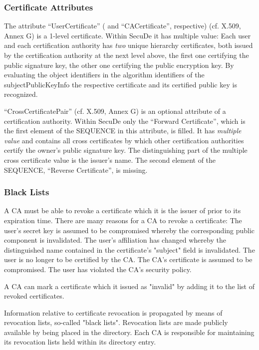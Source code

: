 \subsubsection{Certificate Attributes}
\label{ds-ca}

The attribute ``UserCertificate'' ( and ``CACertificate'', respective)
(cf. X.509, Annex G)
is a 1-level certificate. Within SecuDe
it has multiple value:
Each user and each certification authority has {\em two}
unique hierarchy certificates, both issued by the certification
authority at the next level above,
the first one certifying
the public signature key, the other one certifying
the public encryption key.
By evaluating the object identifiers in the algorithm identifiers
of the subjectPublicKeyInfo the respective certificate and its
certified public key is recognized.

``CrossCertificatePair'' (cf. X.509, Annex G)
is an optional attribute of a certification authority.
Within SecuDe
only the ``Forward Certificate'',
which is the first element of the SEQUENCE in this attribute,
is filled.
It has {\em multiple value}
and contains all cross certificates by which other
certification authorities certify the owner's
public signature key.
The distinguishing part of the multiple cross certificate value
is the issuer's name.
The second element of the SEQUENCE,
``Reverse Certificate'', is missing.

\subsubsection{Black Lists}
\label{ds-bl}

A CA must be able to revoke a certificate which it is the issuer
of prior to its expiration time. There are many reasons for a CA
to revoke a certificate:
\bi
\m The user's secret key is assumed to be compromised whereby the
corresponding public component is invalidated.
\m The user's affiliation has changed whereby the distinguished
name contained in the certificate's "subject" field is invalidated.
\m The user is no longer to be certified by the CA.
\m The CA's certificate is assumed to be compromised.
\m The user has violated the CA's security policy.
\ei

A CA can mark a certificate which it issued as "invalid" by adding
it to the list of revoked certificates.

Information relative to certificate revocation is propagated by
means of revocation lists, so-called "black lists".
Revocation lists are made publicly available by being placed in
the directory. Each CA is responsible for maintaining its
revocation lists held within its directory entry.


